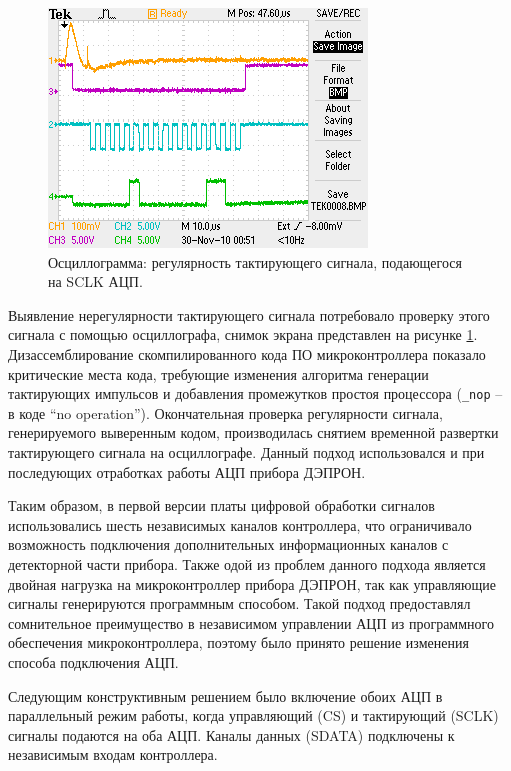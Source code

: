 \begin{figure}
\centering
\includegraphics[width=0.7\linewidth]{images/TEK0008}
\caption{Осциллограмма: регулярность тактирующего сигнала, подающегося на SCLK АЦП.}
\label{fig:oscadc}
\end{figure}


Выявление нерегулярности тактирующего сигнала потребовало проверку этого сигнала с помощью осциллографа, снимок экрана представлен на рисунке \ref{fig:oscadc}. Дизассемблирование скомпилированного кода ПО микроконтроллера показало критические места кода, требующие изменения алгоритма генерации тактирующих импульсов и добавления промежутков простоя процессора (\texttt{\_nop} -- в коде ``no operation''). Окончательная проверка регулярности сигнала, генерируемого выверенным кодом, производилась снятием временной развертки тактирующего сигнала  на осциллографе. Данный подход использовался и при последующих отработках работы АЦП прибора ДЭПРОН.


Таким образом, в первой версии платы цифровой обработки сигналов использовались шесть независимых каналов контроллера, что ограничивало возможность подключения дополнительных информационных каналов с детекторной части прибора. Также одой из проблем данного подхода является двойная нагрузка на микроконтроллер прибора ДЭПРОН, так как управляющие сигналы генерируются программным способом. Такой подход предоставлял сомнительное преимущество в независимом управлении АЦП из программного обеспечения микроконтроллера, поэтому было принято решение изменения способа подключения АЦП.

Следующим конструктивным решением было включение обоих АЦП в параллельный режим работы, когда управляющий (CS) и тактирующий (SCLK) сигналы подаются на оба АЦП. Каналы данных (SDATA) подключены к независимым входам контроллера. 

